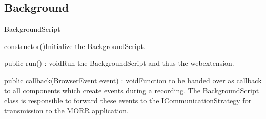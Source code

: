 \subsection{Background}
\begin{class}{BackgroundScript}




\begin{constructors}
\begin{constructor}{constructor()}{Initialize the BackgroundScript.}
\end{constructor}
\end{constructors}
\begin{methods}
\begin{method}{public run() : void}{Run the BackgroundScript and thus the webextension.}
\end{method}
\begin{method}{public callback(BrowserEvent event) : void}{Function to be handed over as callback to all components which create events during a recording. The BackgroundScript class is responsible to forward these events to the ICommunicationStrategy for transmission to the MORR application.}
\begin{parameters}
\end{parameters}
\end{method}
\end{methods}
\end{class}

